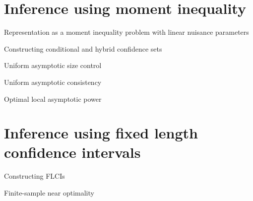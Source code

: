 \documentclass[xcolor=svgnames,aspectratio=169]{beamer}
\begin{document}
\section{Inference using moment inequality}

\begin{frame}{Representation as a moment inequality problem with linear nuisance parameters}
    \begin{itemize}
    \end{itemize}
\end{frame}

\begin{frame}{Constructing conditional and hybrid confidence sets}
    \begin{itemize}
    \end{itemize}
\end{frame}

\begin{frame}{Uniform asymptotic size control}
    \begin{itemize}
    \end{itemize}
\end{frame}

\begin{frame}{Uniform asymptotic consistency}
    \begin{itemize}
    \end{itemize}
\end{frame}

\begin{frame}{Optimal local asymptotic power}
    \begin{itemize}
    \end{itemize}
\end{frame}

\section{Inference using fixed length confidence intervals}

\begin{frame}{Constructing FLCIs}
    \begin{itemize}
    \end{itemize}
\end{frame}

\begin{frame}{Finite-sample near optimality}
    \begin{itemize}
    \end{itemize}
\end{frame}
\end{document}

